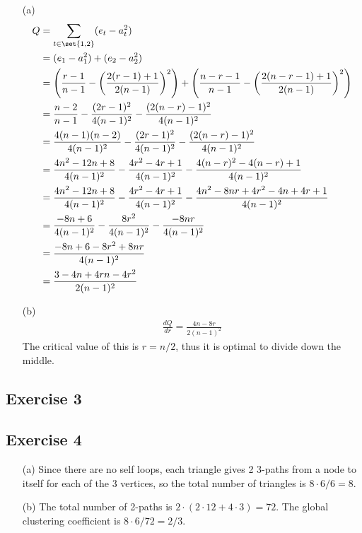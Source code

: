 \documentclass{article}
\begin{document}
\begin{enumerate}
  \item[(a)]
  \begin{align*}
    Q &= \sum_{t \in \set{1, 2}} (e_t - a_t^2) \\
    &= (e_1 - a_1^2) + (e_2 - a_2^2) \\
    &= \left( \frac{r - 1}{n - 1} - \left( \frac{2(r - 1) + 1}{2(n - 1)} \right)^2
    \right) + \left( \frac{n - r - 1}{n - 1} - \left( \frac{2(n - r - 1) + 1}{2(n
    - 1)} \right)^2 \right) \\
    &= \frac{n - 2}{n - 1} - \frac{(2r - 1)^2}{4(n - 1)^2} - \frac{(2(n - r) -
    1)^2}{4(n - 1)^2} \\
    &= \frac{4(n - 1)(n - 2)}{4(n - 1)^2} - \frac{(2r - 1)^2}{4(n - 1)^2} - \frac{(2(n - r) - 1)^2}{4(n - 1)^2} \\
    &= \frac{4n^2 - 12n + 8}{4(n - 1)^2} - \frac{4r^2 - 4r + 1}{4(n - 1)^2} - \frac{4(n - r)^2 - 4(n - r) + 1}{4(n - 1)^2} \\
    &= \frac{4n^2 - 12n + 8}{4(n - 1)^2} - \frac{4r^2 - 4r + 1}{4(n - 1)^2} - \frac{4n^2 - 8nr + 4r^2 - 4n + 4r + 1}{4(n - 1)^2} \\
    &= \frac{-8n + 6}{4(n - 1)^2} - \frac{8r^2}{4(n - 1)^2} - \frac{-8nr}{4(n - 1)^2} \\
    &= \frac{-8n + 6 - 8r^2 + 8nr}{4(n - 1)^2} \\
    &= \frac{3 - 4n + 4rn - 4r^2}{2(n - 1)^2}
  \end{align*}

  \item[(b)]
  \begin{gather*}
    \frac{dQ}{dr} = \frac{4n - 8r}{2(n - 1)^2}
  \end{gather*}
  The critical value of this is \( r = n / 2 \), thus it is optimal to divide
  down the middle.
\end{enumerate}

\newpage

\subsection*{Exercise 3}

\newpage

\subsection*{Exercise 4}

\begin{enumerate}
  \item[(a)]
  Since there are no self loops, each triangle gives 2 3-paths from a node to
  itself for each of the 3 vertices, so the total number of triangles is \( 8
  \cdot 6 / 6 = \boxed{8} \).

  \item[(b)]
  The total number of 2-paths is \( 2 \cdot (2 \cdot 12 + 4 \cdot 3) = 72 \).
  The global clustering coefficient is \( 8 \cdot 6 / 72 = \boxed{2 / 3} \).
\end{enumerate}
\end{document}
